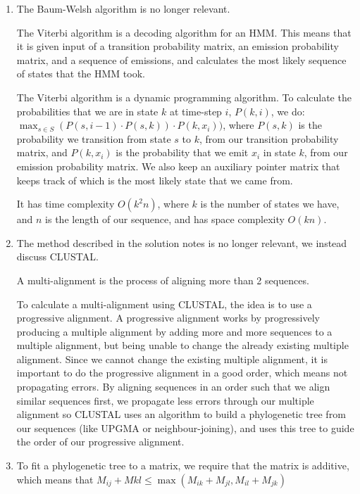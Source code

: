 


\begin{enumerate}[label=(\alph*)]

  \item
    The Baum-Welsh algorithm is no longer relevant.

    The Viterbi algorithm is a decoding algorithm for an HMM. This means that it is given input of a transition probability matrix, an emission probability matrix, and a sequence of emissions, and calculates the most likely sequence of states that the HMM took.

    The Viterbi algorithm is a dynamic programming algorithm. To calculate the probabilities that we are in state $k$ at time-step $i$, $P(k,i)$, we do: $\max_{s \in S}(P(s, i-1) \cdot P(s, k)) \cdot P(k, x_i))$, where $P(s,k)$ is the probability we transition from state $s$ to $k$, from our transition probability matrix, and $P(k, x_i)$ is the probability that we emit $x_i$ in state $k$, from our emission probability matrix. We also keep an auxiliary pointer matrix that keeps track of which is the most likely state that we came from.

    It has time complexity $O(k^2n)$, where $k$ is the number of states we have, and $n$ is the length of our sequence, and has space complexity $O(kn)$.

  \item
    The method described in the solution notes is no longer relevant, we instead discuss CLUSTAL.

    A multi-alignment is the process of aligning more than 2 sequences.

    To calculate a multi-alignment using CLUSTAL, the idea is to use a progressive alignment. A progressive alignment works by progressively producing a multiple alignment by adding more and more sequences to a multiple alignment, but being unable to change the already existing multiple alignment. Since we cannot change the existing multiple alignment, it is important to do the progressive alignment in a good order, which means not propagating errors. By aligning sequences in an order such that we align similar sequences first, we propagate less errors through our multiple alignment so CLUSTAL uses an algorithm to build a phylogenetic tree from our sequences (like UPGMA or neighbour-joining), and uses this tree to guide the order of our progressive alignment.

  \item
    To fit a phylogenetic tree to a matrix, we require that the matrix is additive, which means that $M_{ij} + M{kl} \leq \max(M_{ik} + M_{jl}, M_{il} + M_{jk})$


\end{enumerate}
